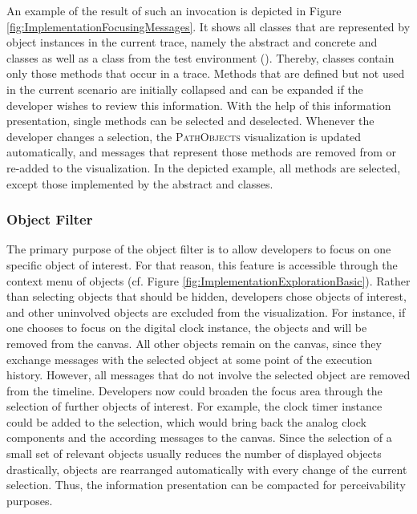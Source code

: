 An example of the result of such an invocation is depicted in Figure \ref{fig:ImplementationFocusingMessages}.
It shows all classes that are represented by object instances in the current trace, namely the abstract and concrete  and  classes as well as a class from the test environment ().
Thereby, classes contain only those methods that occur in a trace.
Methods that are defined but not used in the current scenario are initially collapsed and can be expanded if the developer wishes to review this information.
With the help of this information presentation, single methods can be selected and deselected.
Whenever the developer changes a selection, the \textsc{PathObjects} visualization is updated automatically, and messages that represent those methods are removed from or re-added to the visualization.
In the depicted example, all methods are selected, except those implemented by the abstract  and  classes.

\subsubsection{Object Filter}
The primary purpose of the object filter is to allow developers to focus on one specific object of interest.
For that reason, this feature is accessible through the context menu of objects (cf. Figure \ref{fig:ImplementationExplorationBasic}).
Rather than selecting objects that should be hidden, developers chose objects of interest, and other uninvolved objects are excluded from the visualization.
For instance, if one chooses to focus on the digital clock instance, the objects  and  will be removed from the canvas.
All other objects remain on the canvas, since they exchange messages with the selected object at some point of the execution history.
However, all messages that do not involve the selected object are removed from the timeline.
Developers now could broaden the focus area through the selection of further objects of interest.
For example, the clock timer instance could be added to the selection, which would bring back the analog clock components and the according messages to the canvas.
Since the selection of a small set of relevant objects usually reduces the number of displayed objects drastically, objects are rearranged automatically with every change of the current selection.
Thus, the information presentation can be compacted for perceivability purposes.

